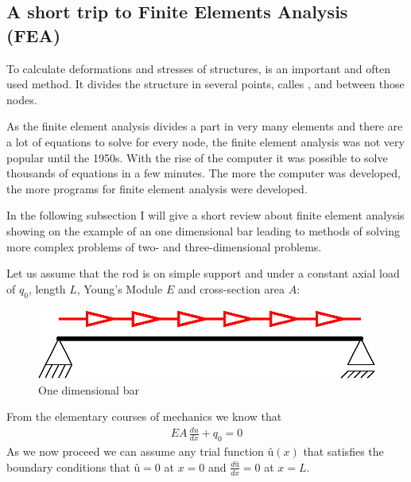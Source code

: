 \subsection{A short trip to Finite Elements Analysis (FEA)}
To calculate deformations and stresses of structures,  is an important and often used method. It divides the structure in several points, calles , and  between those nodes. 
\bigskip

As the finite element analysis divides a part in very many elements and there are a lot of equations to solve for every node, the finite element analysis was not very popular until the 1950s. With the rise of the computer it was possible to solve thousands of equations in a few minutes. The more the computer was developed, the more programs for finite element analysis were developed.
\bigskip

In the following subsection I will give a short review about finite element analysis showing on the example of an one dimensional bar leading to methods of solving more complex problems of two- and three-dimensional problems.
\bigskip

Let us assume that the rod is on simple support and under a constant axial load of $q_0$, length $L$, Young's Module $E$ and cross-section area $A$:
\bigskip

\begin{figure}
\begin{center}
\includegraphics[scale=1]{OneDimensionalBar}
\caption{One dimensional bar}
\end{center}
\end{figure}

\bigskip
From the elementary courses of mechanics we know that
\begin{align}
EA\,\frac{du}{dx}+q_0=0 \label{Rod_Main}
\end{align}
As we now proceed we can assume any trial function $û(x)$ that satisfies the boundary conditions that $û=0$ at $x=0$ and $\frac{dû}{dx}=0$ at $x=L$.

